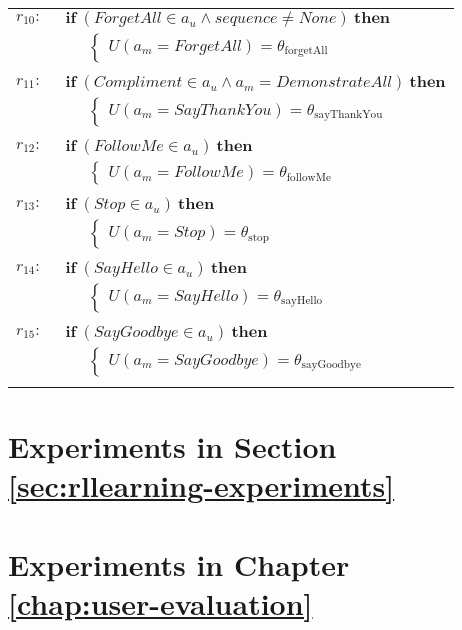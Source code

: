 \begin{small}
\begin{longtable}{p{3cm}l}
$r_{10}: \ \ $& $\textbf{if} \ (\mathit{ForgetAll}\!\in\!\mathit{a_u} \land \mathit{sequence}\!\neq\!\mathit{None}) \ \textbf{then}$ \\
& $\;\;\;\;\; \begin{cases}U(\mathit{a_m}\!=\!\mathit{ForgetAll})\!=\!\theta_{\mathrm{forgetAll}}\end{cases}$ \\[3mm] \hdashline \\[-2mm]
$r_{11}: \ \ $& $\textbf{if} \ (\mathit{Compliment}\!\in\!\mathit{a_u} \land \mathit{a_m}\!=\!\mathit{DemonstrateAll}) \ \textbf{then}$ \\
& $\;\;\;\;\; \begin{cases}U(\mathit{a_m}\!=\!\mathit{SayThankYou})\!=\!\theta_{\mathrm{sayThankYou}}\end{cases}$ \\[3mm] \hdashline \\[-2mm]
$r_{12}: \ \ $& $\textbf{if} \ (\mathit{FollowMe}\!\in\!\mathit{a_u}) \ \textbf{then}$ \\
& $\;\;\;\;\; \begin{cases}U(\mathit{a_m}\!=\!\mathit{FollowMe})\!=\!\theta_{\mathrm{followMe}}\end{cases}$ \\[3mm] \hdashline \\[-2mm]
$r_{13}: \ \ $& $\textbf{if} \ (\mathit{Stop}\!\in\!\mathit{a_u}) \ \textbf{then} $\\
& $\;\;\;\;\; \begin{cases}U(\mathit{a_m}\!=\!\mathit{Stop})\!=\!\theta_{\mathrm{stop}}\end{cases} $\\[3mm] \hdashline \\[-2mm]
$r_{14}: \ \ $&$ \textbf{if} \ (\mathit{SayHello}\!\in\!\mathit{a_u}) \ \textbf{then} $\\
& $\;\;\;\;\; \begin{cases}U(\mathit{a_m}\!=\!\mathit{SayHello})\!=\!\theta_{\mathrm{sayHello}}\end{cases}$ \\[3mm] \hdashline \\[-2mm]
$r_{15}: \ \ $&$ \textbf{if} \ (\mathit{SayGoodbye}\!\in\!\mathit{a_u}) \ \textbf{then} $\\
& $\;\;\;\;\; \begin{cases}U(\mathit{a_m}\!=\!\mathit{SayGoodbye})\!=\!\theta_{\mathrm{sayGoodbye}}\end{cases}$   \\[3mm] \hdashline
\end{longtable}
\end{small}

\section{Experiments in Section \ref{sec:rllearning-experiments}}

\section{Experiments in Chapter \ref{chap:user-evaluation}}


